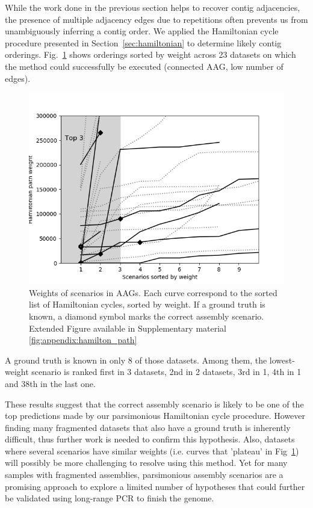 \documentclass[./main.tex]{subfiles}
\newcommand{\modafterreview}[1]{#1}
\begin{document}
While the work done in the previous section helps to recover contig adjacencies, the presence of multiple adjacency edges due to repetitions often prevents us from unambiguously inferring a contig order.
We applied the Hamiltonian cycle procedure presented in Section~\ref{sec:hamiltonian} to determine likely contig orderings. Fig.~\ref{fg:hamilton_path} shows orderings sorted by weight across \modafterreview{23} datasets on which the method could successfully be executed (connected AAG, low number of edges).
\begin{figure}[!tpb]
	\centerline{\includegraphics[scale=0.5]{paper/knot/img/hamilton_path.png}}
    \caption{Weights of scenarios in AAGs. Each curve correspond to the sorted list of Hamiltonian cycles, sorted by weight. If a ground truth is known, a diamond symbol marks the correct assembly scenario. Extended Figure available in Supplementary material \ref{fig:appendix:hamilton_path}}
    \label{fg:hamilton_path}
\end{figure}

A ground truth is known in only 8 of those datasets. Among them, the lowest-weight scenario is ranked first in \modafterreview{3 datasets, 2nd in 2 datasets, 3rd in 1, 4th in 1 and 38th in the last one}. 

These results suggest that the correct assembly scenario is likely to be one of the top predictions made by our parsimonious Hamiltonian cycle procedure. However finding many fragmented datasets that also have a ground truth is inherently difficult, thus further work is needed to confirm this hypothesis. Also, datasets where several scenarios have similar weights (i.e. curves that 'plateau' in Fig~\ref{fg:hamilton_path}) will possibly be more challenging to resolve using this method. \modafterreview{Yet} for many samples with fragmented assemblies, parsimonious assembly scenarios are a promising approach to explore a limited number of hypotheses that could further be validated using long-range PCR to finish the genome.
\end{document}
